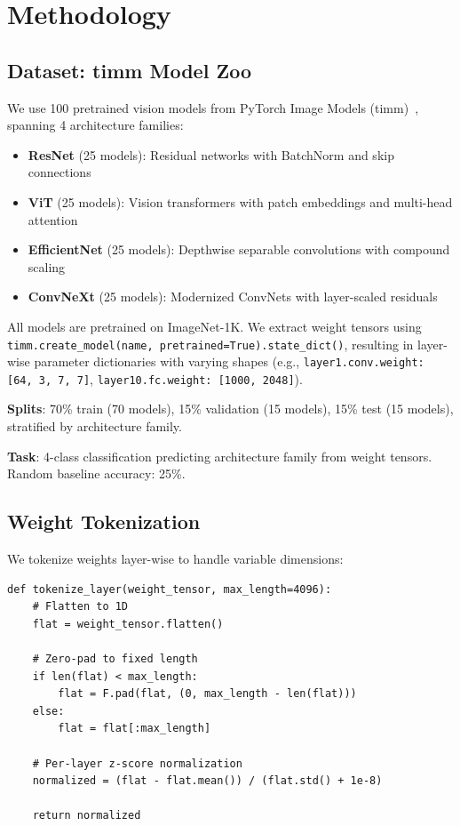 \section{Methodology}

\subsection{Dataset: timm Model Zoo}

We use 100 pretrained vision models from PyTorch Image Models (timm)~\cite{wightman2019pytorch}, spanning 4 architecture families:

\begin{itemize}
\item \textbf{ResNet} (25 models): Residual networks with BatchNorm and skip connections
\item \textbf{ViT} (25 models): Vision transformers with patch embeddings and multi-head attention
\item \textbf{EfficientNet} (25 models): Depthwise separable convolutions with compound scaling
\item \textbf{ConvNeXt} (25 models): Modernized ConvNets with layer-scaled residuals
\end{itemize}

All models are pretrained on ImageNet-1K. We extract weight tensors using \texttt{timm.create\_model(name, pretrained=True).state\_dict()}, resulting in layer-wise parameter dictionaries with varying shapes (e.g., \texttt{layer1.conv.weight: [64, 3, 7, 7]}, \texttt{layer10.fc.weight: [1000, 2048]}).

\textbf{Splits}: 70\% train (70 models), 15\% validation (15 models), 15\% test (15 models), stratified by architecture family.

\textbf{Task}: 4-class classification predicting architecture family from weight tensors. Random baseline accuracy: 25\%.

\subsection{Weight Tokenization}

We tokenize weights layer-wise to handle variable dimensions:

\begin{verbatim}
def tokenize_layer(weight_tensor, max_length=4096):
    # Flatten to 1D
    flat = weight_tensor.flatten()

    # Zero-pad to fixed length
    if len(flat) < max_length:
        flat = F.pad(flat, (0, max_length - len(flat)))
    else:
        flat = flat[:max_length]

    # Per-layer z-score normalization
    normalized = (flat - flat.mean()) / (flat.std() + 1e-8)

    return normalized
\end{verbatim}

